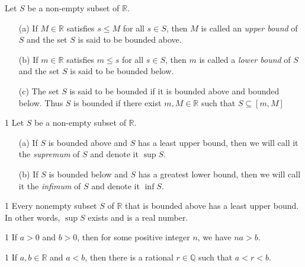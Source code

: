 \begin{defn}{1}
	Let $S$ be a non-empty subset of $\mathbb{R}$.
	\begin{enumerate}
		\item[(a)] If $M \in \mathbb{R}$ satisfies $s \leq M$ for all $s \in S$, then $M$ is
		called an \textit{upper bound} of $S$ and the set $S$ is said to be bounded above.
		
		\item[(b)] If $m \in \mathbb{R}$ satisfies $m \leq s$ for all $s \in S$, then $m$ is
		called a \textit{lower bound} of $S$ and the set $S$ is said to be bounded below.
		
		\item[(c)] The set $S$ is said to be bounded if it is bounded above and bounded below. Thus $S$ is bounded if there exist $m,M \in \mathbb{R}$ such that $S \subseteq [m, M]$
	\end{enumerate}
\end{defn}

\newpage

\begin{defn}{1}
	Let $S$ be a non-empty subset of $\mathbb{R}$.
	\begin{enumerate}
		\item[(a)] If $S$ is bounded above and $S$ has a least upper bound, then we will call it the \textit{supremum} of $S$ and denote it $\sup S$.
		
		\item[(b)] If $S$ is bounded below and $S$ has a greatest lower bound, then we will call it the \textit{infimum} of $S$ and denote it $\inf S$.
	\end{enumerate}
\end{defn}

\begin{defn}{1}
	Every nonempty subset $S$ of $\mathbb{R}$ that is bounded above has a least upper bound. In other words, $\sup S$ exists and is a real number.
\end{defn}

\begin{defn}{1}
	If $a>0$ and $b>0$, then for some positive integer $n$, we have $na >b$.
\end{defn}

\begin{defn}{1}
	If $a,b \in \mathbb{R}$ and $a < b$, then there is a rational $r \in \mathbb{Q}$ such that $a < r < b$.
\end{defn}

